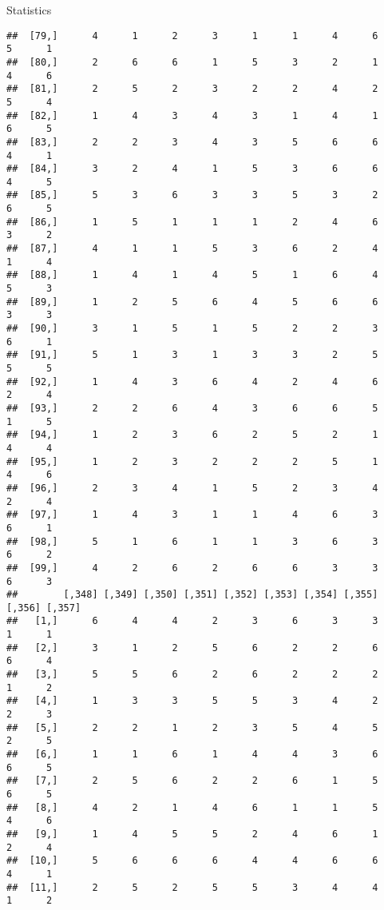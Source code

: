 \documentclass[
  ignorenonframetext,
]{beamer}
\begin{document}
\begin{frame}[fragile]{Statistics}
\begin{verbatim}
##  [79,]      4      1      2      3      1      1      4      6      5      1
##  [80,]      2      6      6      1      5      3      2      1      4      6
##  [81,]      2      5      2      3      2      2      4      2      5      4
##  [82,]      1      4      3      4      3      1      4      1      6      5
##  [83,]      2      2      3      4      3      5      6      6      4      1
##  [84,]      3      2      4      1      5      3      6      6      4      5
##  [85,]      5      3      6      3      3      5      3      2      6      5
##  [86,]      1      5      1      1      1      2      4      6      3      2
##  [87,]      4      1      1      5      3      6      2      4      1      4
##  [88,]      1      4      1      4      5      1      6      4      5      3
##  [89,]      1      2      5      6      4      5      6      6      3      3
##  [90,]      3      1      5      1      5      2      2      3      6      1
##  [91,]      5      1      3      1      3      3      2      5      5      5
##  [92,]      1      4      3      6      4      2      4      6      2      4
##  [93,]      2      2      6      4      3      6      6      5      1      5
##  [94,]      1      2      3      6      2      5      2      1      4      4
##  [95,]      1      2      3      2      2      2      5      1      4      6
##  [96,]      2      3      4      1      5      2      3      4      2      4
##  [97,]      1      4      3      1      1      4      6      3      6      1
##  [98,]      5      1      6      1      1      3      6      3      6      2
##  [99,]      4      2      6      2      6      6      3      3      6      3
##        [,348] [,349] [,350] [,351] [,352] [,353] [,354] [,355] [,356] [,357]
##   [1,]      6      4      4      2      3      6      3      3      1      1
##   [2,]      3      1      2      5      6      2      2      6      6      4
##   [3,]      5      5      6      2      6      2      2      2      1      2
##   [4,]      1      3      3      5      5      3      4      2      2      3
##   [5,]      2      2      1      2      3      5      4      5      2      5
##   [6,]      1      1      6      1      4      4      3      6      6      5
##   [7,]      2      5      6      2      2      6      1      5      6      5
##   [8,]      4      2      1      4      6      1      1      5      4      6
##   [9,]      1      4      5      5      2      4      6      1      2      4
##  [10,]      5      6      6      6      4      4      6      6      4      1
##  [11,]      2      5      2      5      5      3      4      4      1      2

\end{verbatim}
\end{frame}
\end{document}
